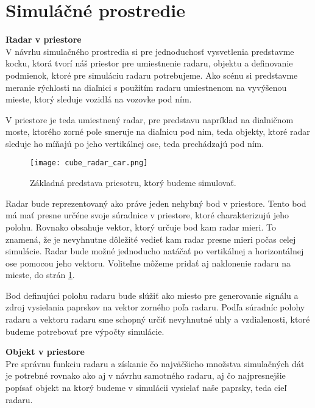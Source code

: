 \documentclass[slovak]{ExcelAtFIT} %
\begin{document}
\section{Simuláčné prostredie}
  \textbf{Radar v priestore}\\
    \hspace{0.6cm}V návrhu simulačného prostredia si pre jednoduchosť vysvetlenia predstavme kocku, ktorá tvorí náš priestor pre umiestnenie radaru, objektu a definovanie podmienok, ktoré pre simuláciu radaru potrebujeme. Ako scénu si predstavme meranie rýchlosti na diaľnici s použitím radaru umiestnenom na vyvýšenou mieste, ktorý sleduje vozidlá na vozovke pod ním.

    V priestore je teda umiestnený radar, pre predstavu napríklad na dialničnom moste, ktorého zorné pole smeruje na diaľnicu pod nim, teda objekty, ktoré radar sleduje ho míňajú po jeho vertikálnej ose, teda prechádzajú pod ním.

	\begin{figure}[t]
		\centering
		\texttt{[image: cube\_radar\_car.png]}
		\caption{Základná predstava priesotru, ktorý budeme simulovať.}
		\label{fig:cube_radar_car}
	\end{figure}

    Radar bude reprezentovaný ako práve jeden nehybný bod v priestore. Tento bod má mať presne určéne svoje súradnice v priestore, ktoré charakterizujú jeho polohu. Rovnako obsahuje vektor, ktorý určuje bod kam radar mieri. To znamená, že je nevyhnutne dôležité vedieť kam radar presne mieri počas celej simulácie. Radar bude možné jednoducho natáčať po vertikálnej a horizontálnej ose pomocou jeho vektoru. Voliteľne môžeme pridať aj naklonenie radaru na mieste, do strán \ref{fig:cube_radar_car}.
    
    Bod definujúci polohu radaru bude slúžiť ako miesto pre generovanie signálu a zdroj vysielania paprskov na vektor zorného poľa radaru. Podľa súradníc polohy radaru a vektoru radaru sme schopný určiť nevyhnutné uhly a vzdialenosti, ktoré budeme potrebovať pre výpočty simulácie.

  \textbf{Objekt v priestore}\\
    \hspace{0.6cm}Pre správnu funkciu radaru a získanie čo najväčšieho množstva simulačných dát je potrebné rovnako ako aj v návrhu samotného radaru, aj čo najpresnejšie popísať objekt na ktorý budeme v simulácii vysielať naše paprsky, teda cieľ radaru. 
\end{document}
